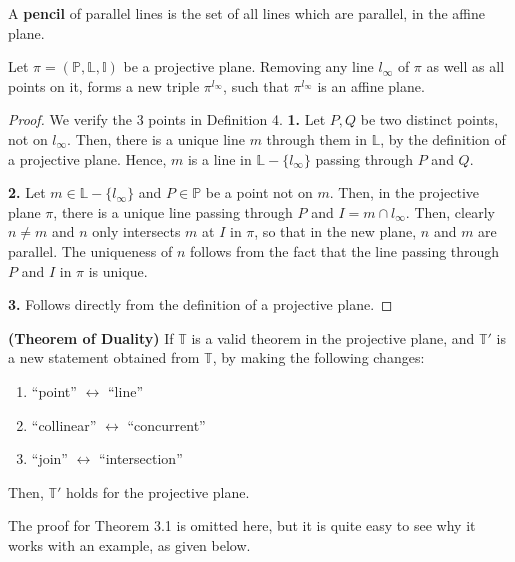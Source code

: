 \documentclass{article}
\begin{document}
\begin{defin}
    A \textbf{pencil} of parallel lines is the set of all lines which are parallel, in the affine plane.
\end{defin}
\begin{Theor*}
    Let $\pi = (\mathbb{P},\mathbb{L},\mathbb{I})$ be a projective plane.\newline
    Removing any line $l_\infty$ of $\pi$ as well as all points on it, forms a new triple $\pi^{l_{\infty}}$, such that $\pi^{l_{\infty}}$ is an affine plane. 
\end{Theor*}
    \begin{proof}
        We verify the 3 points in Definition 4.\newline
        \noindent\textbf{1.} Let $P,Q$ be two distinct points, not on $l_\infty$. Then, there is a unique line $m$ through them in $\mathbb{L}$, by the definition of a projective plane. Hence, $m$ is a line in $\mathbb{L}-\{l_\infty\}$ passing through $P$ and $Q$.\newline

        \noindent\textbf{2.} Let $m\in\mathbb{L}-\{l_\infty\}$ and $P\in\mathbb{P}$ be a point not on $m$. Then, in the projective plane $\pi$, there is a unique line passing through $P$ and $I=m\cap l_\infty$. Then, clearly $n\neq m$ and $n$ only intersects $m$ at $I$ in $\pi$, so that in the new plane, $n$ and $m$ are parallel. The uniqueness of $n$ follows from the fact that the line passing through $P$ and $I$ in $\pi$ is unique.\newline

        \noindent\textbf{3.} Follows directly from the definition of a projective plane.
    \end{proof}


\begin{Theor}
    \textbf{(Theorem of Duality)} If $\mathbb{T}$ is a valid theorem in the projective plane, and $\mathbb{T}'$ is a new statement obtained from $\mathbb{T}$, by making the following changes:
    \begin{enumerate}
        \item \enquote{point} $\longleftrightarrow$ \enquote{line}
        \item \enquote{collinear} $\longleftrightarrow$ \enquote{concurrent}
        \item \enquote{join} $\longleftrightarrow$ \enquote{intersection}
    \end{enumerate}
    Then, $\mathbb{T}'$ holds for the projective plane.
\end{Theor}
The proof for Theorem 3.1 is omitted here, but it is quite easy to see why it works with an example, as given below.
\newline
\end{document}
